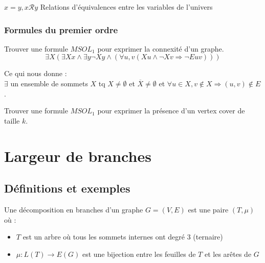 \documentclass[a4paper, 11pt]{thesis}
\begin{document}
$x=y, x\mathcal{R}y$ Relations d'équivalences entre les variables de l'univers

\subsubsection{Formules du premier ordre}


\begin{exo}
    Trouver une formule $MSOL_1$ pour exprimer la connexité d'un graphe.\\

    \begin{displaymath}
        \exists X (\exists Xx \wedge \exists y \neg Xy \wedge (\forall u,v (Xu \wedge \neg Xv \Rightarrow
        \neg E uv ))) 
    \end{displaymath}

    Ce qui nous donne : \\
    $\exists$ un ensemble de sommets $X$ tq $X \neq \emptyset$ et $\overline{X} \neq \emptyset$ et
    $\forall u \in X, v \not \in X \Rightarrow (u,v) \not \in E$.
\end{exo}

\begin{exo}
    Trouver une formule $MSOL_1$ pour exprimer la présence d'un vertex cover de taille $k$.
\end{exo}

\section{Largeur de branches}

\subsection{Définitions et exemples}

\begin{df}
    Une décomposition en branches d'un graphe $G=(V,E)$ est une paire $(T, \mu)$ où :
    \begin{itemize}
        \item $T$ est un arbre où tous les sommets internes ont degré $3$ (ternaire)
        \item $\mu : L(T) \rightarrow E(G)$ est une bijection entre les feuilles de $T$ et les
            arêtes de $G$
    \end{itemize}
\end{df}
\end{document}
